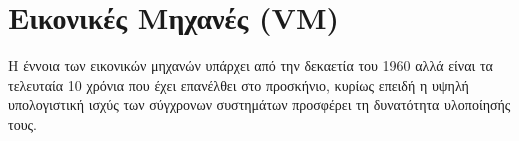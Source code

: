 \section{Εικονικές Μηχανές (VM)}
Η έννοια των εικονικών μηχανών υπάρχει από την δεκαετία του 1960 αλλά είναι τα 
τελευταία 10 χρόνια που έχει επανέλθει στο προσκήνιο, κυρίως επειδή η υψηλή 
υπολογιστική ισχύς των σύγχρονων συστημάτων προσφέρει τη δυνατότητα υλοποίησής 
τους.
